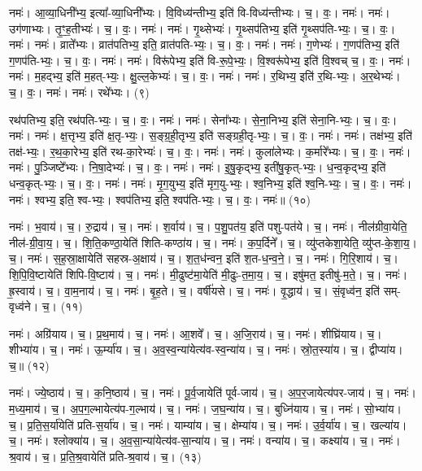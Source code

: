 नमः॑। आ॒व्या॒धिनी᳚भ्य॒ इत्या᳚-व्या॒धिनी᳚भ्यः। वि॒विध्य॑न्तीभ्य॒ इति॑ वि-विध्य॑न्तीभ्यः। च॒। वः॒। नमः॑। नमः॑। उग॑णाभ्यः। तृ॒ꣳ॒ह॒तीभ्यः॑। च॒। वः॒। नमः॑। 
नमः॑। गृ॒थ्सेभ्यः॑। गृ॒थ्सप॑तिभ्य॒ इति॑ गृ॒थ्सप॑ति-भ्यः॒। च॒। वः॒। नमः॑। 
नमः॑। व्राते᳚भ्यः। व्रात॑पतिभ्य॒ इति॒ व्रात॑पति-भ्यः॒। च॒। वः॒। नमः॑। 
नमः॑। ग॒णेभ्यः॑। ग॒णप॑तिभ्य॒ इति॑ ग॒णप॑ति-भ्यः॒। च॒। वः॒। नमः॑। 
नमः॑। विरू॑पेभ्य॒ इति॑ वि-रू॒पे॒भ्यः॒। वि॒श्वरू॑पेभ्य॒ इति॑ वि॒श्वच् च॒। वः॒। नमः॑। 
नमः॑। म॒हद्भ्य॒ इति॑ म॒हत्-भ्यः॒। क्षु॒ल्ल॒केभ्यः॑। च॒। वः॒। नमः॑। 
नमः॑। र॒थिभ्य॒ इति॑ र॒थि-भ्यः॒। अ॒र॒थेभ्यः॑। च॒। वः॒। नमः॑। 
नमः॑। रथे᳚भ्यः। (९)


रथ॑पतिभ्य॒ इति॒ रथ॑पति-भ्यः॒। च॒। वः॒। नमः॑। 
नमः॑। सेना᳚भ्यः। से॒ना॒निभ्य॒ इति॑ सेना॒नि-भ्यः॒। च॒। वः॒। नमः॑। 
नमः॑। क्ष॒त्तृभ्य॒ इति॑ क्ष॒तृ-भ्यः॒। स॒ङ्ग्र॒ही॒तृभ्य॒ इति॑ सङ्ग्रही॒तृ-भ्यः॒। च॒। वः॒। नमः॑। 
नमः॑। तक्ष॑भ्य॒ इति॑ तक्ष॑-भ्यः॒। र॒थ॒का॒रेभ्य॒ इति॑ रथ-का॒रेभ्यः॑। च॒। वः॒। नमः॑। 
नमः॑। कुला॑लेभ्यः। क॒र्मारे᳚भ्यः। च॒। वः॒। नमः॑। 
नमः॑। पु॒ञ्जिष्टे᳚भ्यः। नि॒षा॒देभ्यः॑। च॒। वः॒। नमः॑। 
नमः॑। इ॒षु॒कृद्भ्य॒ इती॑षु॒कृत्-भ्यः॒। ध॒न्व॒कृद्भ्य॒ इति॑ धन्व॒कृत्-भ्यः॒। च॒। वः॒। नमः॑। 
नमः॑। मृ॒ग॒युभ्य॒ इति॑ मृग॒यु-भ्यः॒। श्व॒निभ्य॒ इति॑ श्व॒नि-भ्यः॒। च॒। वः॒। नमः॑। 
नमः॑। श्वभ्य॒ इति॒ श्व-भ्यः॒। श्वप॑तिभ्य॒ इति॒ श्वप॑ति-भ्यः॒। च॒। वः॒। नमः॑॥ (१०)


नमः॑। भ॒वाय॑। च॒। रु॒द्राय॑। च॒। 
नमः॑। श॒र्वाय॑। च॒। प॒शु॒पत॑य॒ इति॑ पशु-पत॑ये। च॒। 
नमः॑। नील॑ग्रीवा॒येति॒ नील॑-ग्री॒वा॒य॒। च॒। शि॒ति॒कण्ठा॒येति॑ शिति-कण्ठा॑य। च॒। 
नमः॑। क॒प॒र्दिने᳚। च॒। व्यु॑प्तकेशा॒येति॒ व्यु॑प्त-के॒शा॒य॒। च॒। 
नमः॑। स॒ह॒स्रा॒क्षायेति॑ सहस्र-अ॒क्षाय॑। च॒। श॒त॒ध॑न्वन॒ इति॑ श॒त-ध॒न्व॒ने॒। च॒। 
नमः॑। गि॒रि॒शाय॑। च॒। शि॒पि॒वि॒ष्टायेति॑ शिपि-वि॒ष्टाय॑। च॒। 
नमः॑। मी॒ढुष्ट॑मा॒येति॑ मी॒ढुः-त॒मा॒य॒। च॒। इषु॑मत॒ इतीषु॑-म॒ते॒। च॒। 
नमः॑। ह्र॒स्वाय॑। च॒। वा॒म॒नाय॑। च॒। 
नमः॑। बृ॒ह॒ते। च॒। वर्षी॑यसे। च॒। 
नमः॑। वृ॒द्धाय॑। च॒। सं॒वृध्व॑न॒ इति॑ सम्-वृध्व॑ने। च॒। (११)


नमः॑। अग्रि॑याय। च॒। प्र॒थ॒माय॑। च॒। 
नमः॑। आ॒शवे᳚। च॒। अ॒जि॒राय॑। च॒। 
नमः॑। शीघ्रि॑याय। च॒। शीभ्या॑य। च॒। 
नमः॑। ऊ॒र्म्या॑य। च॒। अ॒व॒स्व॒न्या॑येत्य॑व-स्व॒न्या॑य। च॒। 
नमः॑। स्रो॒त॒स्या॑य। च॒। द्वीप्या॑य। च॒॥ (१२)


नमः॑। ज्ये॒ष्ठाय॑। च॒। क॒नि॒ष्ठाय॑। च॒। 
नमः॑। पू॒र्व॒जायेति॑ पूर्व-जाय॑। च॒। अ॒प॒र॒जायेत्य॑पर-जाय॑। च॒। 
नमः॑। म॒ध्य॒माय॑। च॒। अ॒प॒ग॒ल्भायेत्य॑प-ग॒ल्भाय॑। च॒। 
नमः॑। ज॒घ॒न्या॑य। च॒। बुध्नि॑याय। च॒। 
नमः॑। सो॒भ्या॑य। च॒। प्र॒ति॒स॒र्या॑येति॑ प्रति-स॒र्या॑य। च॒। 
नमः॑। याम्या॑य। च॒। क्षेम्या॑य। च॒। 
नमः॑। उ॒र्व॒र्या॑य। च॒। खल्या॑य। च॒। 
नमः॑। श्लोक्या॑य। च॒। अ॒व॒सा॒न्या॑येत्य॑व-सा॒न्या॑य। च॒। 
नमः॑। वन्या॑य। च॒। कक्ष्या॑य। च॒। 
नमः॑। श्र॒वाय॑। च॒। प्र॒ति॒श्र॒वायेति॑ प्रति-श्र॒वाय॑। च॒। (१३)


